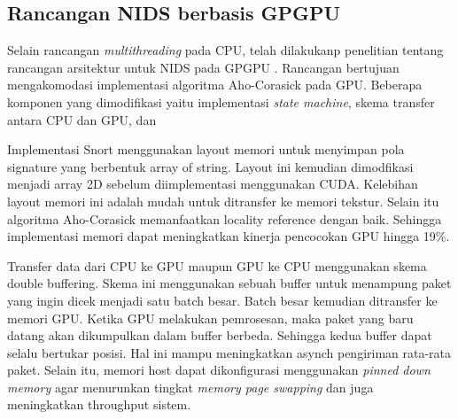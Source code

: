 

  \subsection{Rancangan NIDS berbasis GPGPU}

    Selain rancangan \emph{multithreading} pada CPU, telah dilakukanp penelitian tentang rancangan arsitektur untuk NIDS pada GPGPU \parencite{gnort2008}. Rancangan bertujuan mengakomodasi implementasi algoritma Aho-Corasick pada GPU. Beberapa komponen yang dimodifikasi yaitu implementasi \emph{state machine}, skema transfer antara CPU dan GPU, dan 

    Implementasi Snort menggunakan layout memori untuk menyimpan pola signature yang berbentuk array of string. Layout ini kemudian dimodfikasi menjadi array 2D sebelum diimplementasi menggunakan CUDA. Kelebihan layout memori ini adalah mudah untuk ditransfer ke memori tekstur. Selain itu algoritma Aho-Corasick memanfaatkan locality reference dengan baik. Sehingga implementasi memori dapat meningkatkan kinerja pencocokan GPU hingga 19\%.

    Transfer data dari CPU ke GPU maupun GPU ke CPU menggunakan skema double buffering. Skema ini menggunakan sebuah buffer untuk menampung paket yang ingin dicek menjadi satu batch besar. Batch besar kemudian ditransfer ke memori GPU. Ketika GPU melakukan pemrosesan, maka paket yang baru datang akan dikumpulkan dalam buffer berbeda. Sehingga kedua buffer dapat selalu bertukar posisi. Hal ini mampu meningkatkan asynch pengiriman rata-rata paket. Selain itu, memori host dapat dikonfigurasi menggunakan \emph{pinned down memory} agar menurunkan tingkat \emph{memory page swapping} dan juga meningkatkan throughput sistem.

